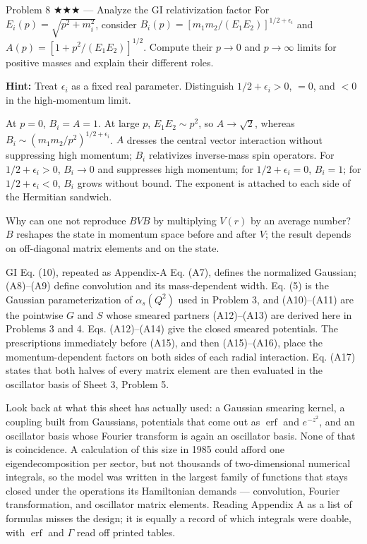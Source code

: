\documentclass[11pt]{article}
\begin{document}
\begin{problem}{Problem 8 ★★★ — Analyze the GI relativization factor}
For $E_i(p)=\sqrt{p^2+m_i^2}$, consider
$B_i(p)=[m_1m_2/(E_1E_2)]^{1/2+\epsilon_i}$ and
$A(p)=[1+p^2/(E_1E_2)]^{1/2}$. Compute their $p\to0$ and $p\to\infty$ limits
for positive masses and explain their different roles.

\textbf{Hint:} Treat $\epsilon_i$ as a fixed real parameter. Distinguish
$1/2+\epsilon_i>0$, $=0$, and $<0$ in the high-momentum limit.
\end{problem}
\begin{solution}
At $p=0$, $B_i=A=1$. At large $p$, $E_1E_2\sim p^2$, so
$A\to\sqrt2$, whereas
$B_i\sim(m_1m_2/p^2)^{1/2+\epsilon_i}$. $A$ dresses the central vector
interaction without suppressing high momentum; $B_i$ relativizes inverse-mass
spin operators. For $1/2+\epsilon_i>0$, $B_i\to0$ and suppresses high
momentum; for $1/2+\epsilon_i=0$, $B_i=1$; for $1/2+\epsilon_i<0$,
$B_i$ grows without bound. The exponent is attached
to each side of the Hermitian sandwich.
\end{solution}
\begin{quiz}
Why can one not reproduce $BVB$ by multiplying $V(r)$ by an average number?
\answer $B$ reshapes the state in momentum space before and after $V$; the
result depends on off-diagonal matrix elements and on the state.
\end{quiz}

\begin{paperbridge}
GI Eq. (10), repeated as Appendix-A Eq. (A7), defines the normalized Gaussian;
(A8)--(A9) define convolution and its mass-dependent width. Eq. (5) is the
Gaussian parameterization of $\alpha_s(Q^2)$ used in Problem 3, and
(A10)--(A11) are the pointwise $G$ and $S$ whose smeared partners
(A12)--(A13) are derived here in Problems 3 and 4. Eqs. (A12)--(A14)
give the closed smeared potentials. The prescriptions immediately before
(A15), and then (A15)--(A16), place the momentum-dependent factors on both sides
of each radial interaction. Eq. (A17) states that both halves of every matrix
element are then evaluated in the oscillator basis of Sheet 3, Problem 5.
\end{paperbridge}

\begin{checkpoint}
Look back at what this sheet has actually used: a Gaussian smearing kernel, a
coupling built from Gaussians, potentials that come out as $\operatorname{erf}$
and $e^{-z^2}$, and an oscillator basis whose Fourier transform is again an
oscillator basis. None of that is coincidence. A calculation of this size in
1985 could afford one eigendecomposition per sector, but not thousands of
two-dimensional numerical integrals, so the model was written in the largest
family of functions that stays closed under the operations its Hamiltonian
demands --- convolution, Fourier transformation, and oscillator matrix
elements. Reading Appendix A as a list of formulas misses the design; it is
equally a record of which integrals were doable, with $\operatorname{erf}$ and
$\Gamma$ read off printed tables.
\end{checkpoint}
\end{document}
